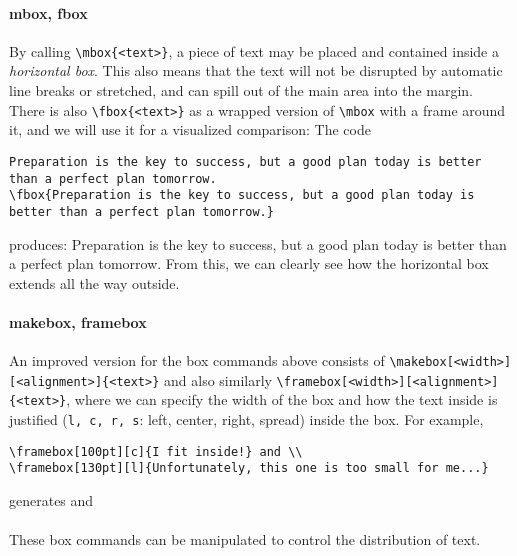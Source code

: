 \paragraph{mbox, fbox}
By calling \texttt{\textbackslash mbox\{<text>\}}, a piece of text may be placed and contained inside a \textit{horizontal box}. This also means that the text will not be disrupted by automatic line breaks or stretched, and can spill out of the main area into the margin. There is also \texttt{\textbackslash fbox\{<text>\}} as a wrapped version of \texttt{\textbackslash mbox} with a frame around it, and we will use it for a visualized comparison: The code
\begin{lstlisting}
Preparation is the key to success, but a good plan today is better than a perfect plan tomorrow.
\fbox{Preparation is the key to success, but a good plan today is better than a perfect plan tomorrow.}
\end{lstlisting}
produces: Preparation is the key to success, but a good plan today is better than a perfect plan tomorrow.
From this, we can clearly see how the horizontal box extends all the way outside.

\paragraph{makebox, framebox}
An improved version for the box commands above consists of \texttt{\textbackslash makebox[<width>][<alignment>]\{<text>\}} and also similarly \texttt{\textbackslash framebox[<width>][<alignment>]\{<text>\}}, where we can specify the width of the box and how the text inside is justified (\verb|l, c, r, s|: left, center, right, spread) inside the box. For example,
\begin{lstlisting}
\framebox[100pt][c]{I fit inside!} and \\
\framebox[130pt][l]{Unfortunately, this one is too small for me...}
\end{lstlisting}
generates  and \\
 \\
These box commands can be manipulated to control the distribution of text.


